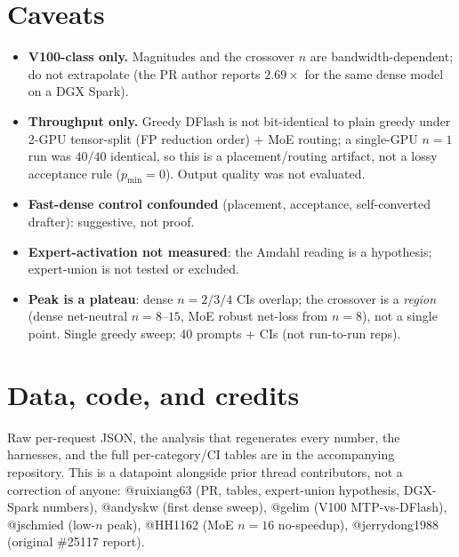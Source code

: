 \documentclass[11pt]{article}
\begin{document}
\section{Caveats}
\begin{itemize}[leftmargin=1.4em,itemsep=1pt]
\item \textbf{V100-class only.} Magnitudes and the crossover $n$ are bandwidth-dependent; do not extrapolate (the PR author reports
$2.69\times$ for the same dense model on a DGX Spark).
\item \textbf{Throughput only.} Greedy DFlash is not bit-identical to plain greedy under 2-GPU tensor-split (FP reduction order) $+$
MoE routing; a single-GPU $n{=}1$ run was $40/40$ identical, so this is a placement/routing artifact, not a lossy acceptance rule
($p_{\min}{=}0$). Output quality was not evaluated.
\item \textbf{Fast-dense control confounded} (placement, acceptance, self-converted drafter): suggestive, not proof.
\item \textbf{Expert-activation not measured}: the Amdahl reading is a hypothesis; expert-union is not tested or excluded.
\item \textbf{Peak is a plateau}: dense $n{=}2/3/4$ CIs overlap; the crossover is a \emph{region} (dense net-neutral $n{=}8\text{--}15$,
MoE robust net-loss from $n{=}8$), not a single point. Single greedy sweep; 40 prompts + CIs (not run-to-run reps).
\end{itemize}

\section*{Data, code, and credits}
Raw per-request JSON, the analysis that regenerates every number, the harnesses, and the full per-category/CI tables are in the
accompanying repository. This is a datapoint alongside prior thread contributors, not a correction of anyone: @ruixiang63 (PR,
tables, expert-union hypothesis, DGX-Spark numbers), @andyskw (first dense sweep), @gelim (V100 MTP-vs-DFlash), @jschmied (low-$n$
peak), @HH1162 (MoE $n{=}16$ no-speedup), @jerrydong1988 (original \#25117 report).
\end{document}
